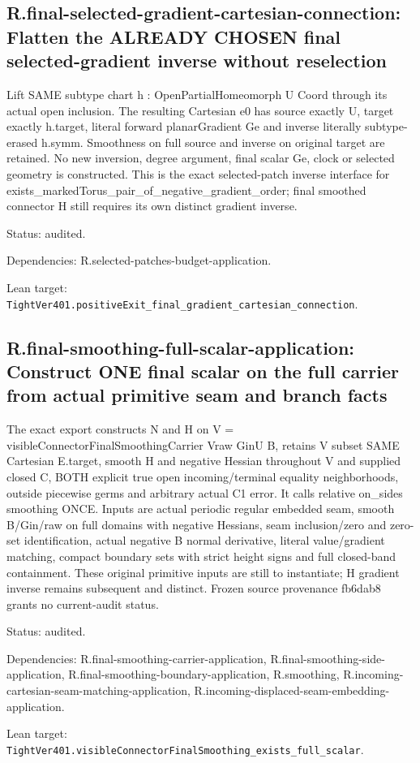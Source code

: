 \documentclass{article}
\begin{document}
\subsection*{R.final-selected-gradient-cartesian-connection: Flatten the ALREADY CHOSEN final selected-gradient inverse without reselection}
Lift SAME subtype chart h : OpenPartialHomeomorph U Coord through its actual open inclusion. The resulting Cartesian e0 has source exactly U, target exactly h.target, literal forward planarGradient Ge and inverse literally subtype-erased h.symm. Smoothness on full source and inverse on original target are retained. No new inversion, degree argument, final scalar Ge, clock or selected geometry is constructed. This is the exact selected-patch inverse interface for exists\_markedTorus\_pair\_of\_negative\_gradient\_order; final smoothed connector H still requires its own distinct gradient inverse.
\par Status: audited.
\par Dependencies: R.selected-patches-budget-application.
\par Lean target: \texttt{TightVer401.positiveExit\_final\_gradient\_cartesian\_connection}.
\subsection*{R.final-smoothing-full-scalar-application: Construct ONE final scalar on the full carrier from actual primitive seam and branch facts}
The exact export constructs N and H on V = visibleConnectorFinalSmoothingCarrier Vraw GinU B, retains V subset SAME Cartesian E.target, smooth H and negative Hessian throughout V and supplied closed C, BOTH explicit true open incoming/terminal equality neighborhoods, outside piecewise germs and arbitrary actual C1 error. It calls relative on\_sides smoothing ONCE. Inputs are actual periodic regular embedded seam, smooth B/Gin/raw on full domains with negative Hessians, seam inclusion/zero and zero-set identification, actual negative B normal derivative, literal value/gradient matching, compact boundary sets with strict height signs and full closed-band containment. These original primitive inputs are still to instantiate; H gradient inverse remains subsequent and distinct. Frozen source provenance fb6dab8 grants no current-audit status.
\par Status: audited.
\par Dependencies: R.final-smoothing-carrier-application, R.final-smoothing-side-application, R.final-smoothing-boundary-application, R.smoothing, R.incoming-cartesian-seam-matching-application, R.incoming-displaced-seam-embedding-application.
\par Lean target: \texttt{TightVer401.visibleConnectorFinalSmoothing\_exists\_full\_scalar}.
\end{document}
